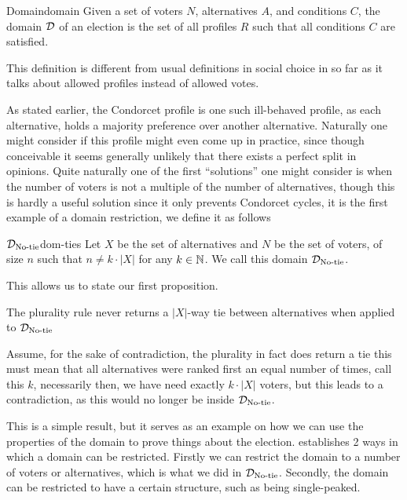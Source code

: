 \begin{definition}{Domain}{domain}
	{
		Given a set of voters $N$, alternatives $A$, and conditions $C$, the domain $\mathcal{D}_{\textnormal{}}$ of an election is the set of all profiles $R$ such that all conditions $C$ are satisfied.
	}
\end{definition}

This definition is different from usual definitions in social choice in so far as it talks about allowed profiles instead of allowed votes.


As stated earlier, the Condorcet profile is one such ill-behaved profile, as each alternative, holds a majority preference over another alternative. Naturally one might consider if this profile might even come up in practice, since though conceivable it seems generally unlikely that there exists a perfect split in opinions. Quite naturally one of the first ``solutions'' one might consider is when the number of voters is not a multiple of the number of alternatives, though this is hardly a useful solution since it only prevents Condorcet cycles, it is the first example of a domain restriction, we define it as follows

\begin{definition}{$\mathcal{D}_{\textnormal{No-tie}}$}{dom-ties}
	Let $X$ be the set of alternatives and $N$ be the set of voters, of size $n$ such that $n \neq k \cdot |X|$ for any $k \in \mathbb{N}$. We call this domain $\mathcal{D}_{\textnormal{No-tie}}$.
\end{definition}

This allows us to state our first proposition.

\begin{proposition}
	The plurality rule never returns a $|X|$-way tie between alternatives when applied to $\mathcal{D}_{\textnormal{No-tie}}$
\end{proposition}

\begin{proofc}
	Assume, for the sake of contradiction, the plurality in fact does return a tie this must mean that all alternatives were ranked first an equal number of times, call this $k$, necessarily then, we have need exactly $k \cdot |X|$ voters, but this leads to a contradiction, as this would no longer be inside $\mathcal{D}_{\textnormal{No-tie}}$.
\end{proofc}

This is a simple result, but it serves as an example on how we can use the properties of the domain to prove things about the election. \citet{gaertnerDomainRestrictions2002} establishes 2 ways in which a domain can be restricted. Firstly we can restrict the domain to a number of voters or alternatives, which is what we did in $\mathcal{D}_{\textnormal{No-tie}}$. Secondly, the domain can be restricted to have a certain structure, such as being single-peaked.

